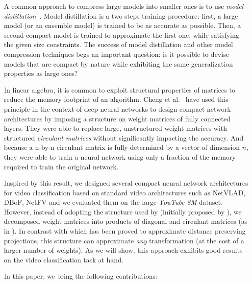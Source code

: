 \documentclass[runningheads]{llncs}
\newcommand{\yt}{\textit{YouTube-8M}\xspace}
\begin{document}
A common approach to compress large models into smaller ones is to use {\em model distillation}~\cite{44873}. Model distillation is a two steps training procedure: first, a large model (or an ensemble model) is trained to be as accurate as possible. Then, a second compact model is trained to approximate the first one, while satisfying the given size constraints. The success of model distillation and other model compression techniques begs an important question: is it possible to devise models that are compact by nature while exhibiting the same generalization properties as large ones?

In linear algebra, it is common to exploit structural properties of matrices to reduce the memory footprint of an algorithm. 
Cheng et al.~\cite{7410684} have used this principle in the context of deep neural networks to design compact network architectures by imposing a structure on weight matrices of fully connected layers. They were able to replace large, unstructured weight matrices with structured \textit{circulant matrices} without significantly impacting the accuracy. And because a n-by-n circulant matrix is fully determined by a vector of dimension $n$, they were able to train a neural network using only a fraction of the memory required to train the original network.

Inspired by this result, we designed several compact neural network architectures for video classification based on standard video architectures such as NetVLAD, DBoF, NetFV and we evaluated them on the large \yt dataset. However, instead of adopting the structure used by \cite{7410684} (initially proposed by \cite{VYBIRAL20111096}), we decomposed weight matrices into products of diagonal and circulant matrices (as in \cite{schmid2000decomposing}). In contrast with \cite{VYBIRAL20111096} which has been proved to approximate distance preserving projections, this structure can approximate \textit{any} transformation (at the cost of a larger number of weights). As we will show, this approach exhibits good results on the video classification task at hand. 

In this paper, we bring the following contributions:
\end{document}
